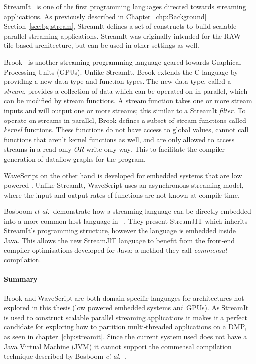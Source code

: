 StreamIt~\cite{theis2002streamit} is one of the first programming languages directed towards streaming applications.
As previously described in Chapter~\ref{chp:Background} Section~\ref{sec:bg:stream}, StreamIt defines a set of constructs to build scalable parallel streaming applications.
StreamIt was originally intended for the RAW~\cite{waingold1997raw} tile-based architecture, but can be used in other settings as well.

Brook~\cite{buck2004brook} is another streaming programming language geared towards Graphical Processing Units (GPUs).
Unlike StreamIt, Brook extends the C language by providing a new data type and function types.
The new data type, called a \textit{stream}, provides a collection of data which can be operated on in parallel, which can be modified by stream functions.
A stream function takes one or more stream inputs and will output one or more streams; this similar to a StreamIt \textit{filter}.
To operate on streams in parallel, Brook defines a subset of stream functions called \textit{kernel} functions.
These functions do not have access to global values, cannot call functions that aren't kernel functions as well, and are only allowed to access streams in a read-only \textit{OR} write-only way.
This to facilitate the compiler generation of dataflow graphs for the program.

WaveScript on the other hand is developed for embedded systems that are low powered \cite{newton2008wavescript}.
Unlike StreamIt, WaveScript uses an asynchronous streaming model, where the input and output rates of functions are not known at compile time.

Bosboom {\it et al.~}demonstrate how a streaming language can be directly embedded into a more common host-language in ~\cite{bosboom2014streamjit}.
They present StreamJIT which inherits StreamIt's programming structure, however the language is embedded inside Java.
This allows the new StreamJIT language to benefit from the front-end compiler optimisations developed for Java; a method they call \textit{commensal} compilation.
\vspace{-1em}
\paragraph*{Summary}
Brook and WaveScript are both domain specific languages for architectures not explored in this thesis (low powered embedded systems and GPUs).
As StreamIt is used to construct scalable parallel streaming applications it makes it a perfect candidate for exploring how to partition multi-threaded applications on a DMP, as seen in chapter~\ref{chp:streamit}.
Since the current system used does not have a Java Virtual Machine (JVM) it cannot support the commensal compilation technique described by Bosboom {\it et al.~}.

